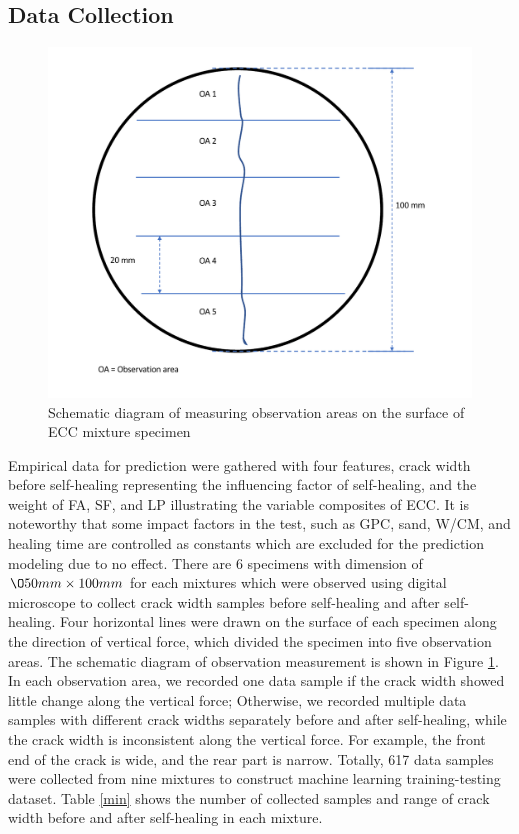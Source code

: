 \documentclass[11pt]{article}
\begin{document}
	\subsection{Data Collection}
	\label{dc}
	
	\begin{figure}[!h]
		\centering
		\includegraphics[width=.75\textwidth]{measurement}
		\caption{Schematic diagram of measuring observation areas on the surface of ECC mixture specimen}
		\label{ma}
	\end{figure}
	
	
	Empirical data for prediction were gathered with four features, crack width before self-healing representing the influencing factor of self-healing, and the weight of FA, SF, and LP illustrating the variable composites of ECC. It is noteworthy that some impact factors in the test, such as GPC, sand, W/CM, and healing time are controlled as constants which are excluded for the prediction modeling due to no effect. There are 6 specimens with dimension of $\O 50mm \times 100mm$ for each mixtures which were observed using digital microscope to collect crack width samples before self-healing and after self-healing. Four horizontal lines were drawn on the surface of each specimen along the direction of vertical force, which divided the specimen into five observation areas. The schematic diagram of observation measurement is shown in Figure \ref{ma}. In each observation area, we recorded one data sample if the crack width showed little change along the vertical force; Otherwise, we recorded multiple data samples with different crack widths separately before and after self-healing, while the crack width is inconsistent along the vertical force. For example, the front end of the crack is wide, and the rear part is narrow. Totally, 617 data samples were collected from nine mixtures to construct machine learning training-testing dataset. Table \ref{min} shows the number of collected samples and range of crack width before and after self-healing in each mixture. 
	
\end{document}
